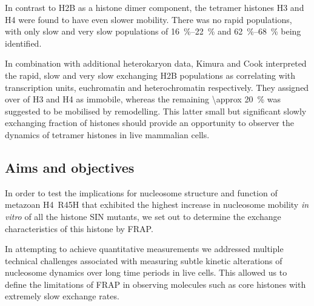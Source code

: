     In contrast to H2B as a histone dimer component, the tetramer
    histones H3 and H4 were found to have even slower mobility.  There
    was no rapid populations, with only slow and very slow populations
    of \SIrange{16}{22}{\percent} and \SIrange{62}{68}{\percent} being
    identified.

    In combination with additional heterokaryon data, Kimura and Cook
    interpreted the rapid, slow and very slow exchanging H2B
    populations as correlating with transcription units, euchromatin
    and heterochromatin respectively.  They assigned over 
    of H3 and H4 as immobile, whereas the remaining
    \SI{\approx 20}{\percent} was suggested to be mobilised by
    remodelling.  This latter small but significant
    slowly exchanging fraction of histones
    should provide an opportunity to observer the dynamics of
    tetramer histones in live mammalian cells.


  \subsection{Aims and objectives}

    In order to test the implications for nucleosome structure and function
    of metazoan H4~R45H that exhibited the highest increase
    in nucleosome mobility \textit{in vitro} of all the histone SIN mutants,
    we set out to determine the exchange characteristics
    of this histone by FRAP.

    In attempting to achieve quantitative measurements
    we addressed multiple technical challenges associated with
    measuring subtle kinetic alterations of nucleosome dynamics
    over long time periods in live cells.
    This allowed us to define the limitations of FRAP in observing molecules
    such as core histones with extremely slow exchange rates.
